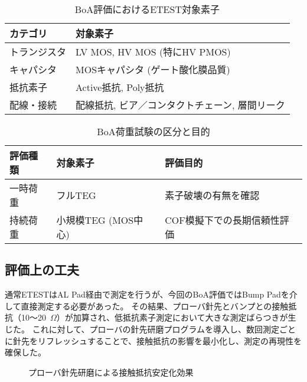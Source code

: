 \documentclass[conference]{IEEEtran}
\begin{document}
\begin{table}[htbp]
\centering
\caption{BoA評価におけるETEST対象素子}
\label{tab:etest_devices}
\begin{tabular}{|l|l|}
\hline
カテゴリ & 対象素子 \\
\hline
トランジスタ & LV MOS, HV MOS (特にHV PMOS) \\
キャパシタ   & MOSキャパシタ (ゲート酸化膜品質) \\
抵抗素子     & Active抵抗, Poly抵抗 \\
配線・接続   & 配線抵抗, ビア／コンタクトチェーン, 層間リーク \\
\hline
\end{tabular}
\end{table}

\begin{table}[htbp]
\centering
\caption{BoA荷重試験の区分と目的}
\label{tab:load_test}
\begin{tabular}{|l|l|l|}
\hline
評価種類 & 対象素子 & 評価目的 \\
\hline
一時荷重 & フルTEG & 素子破壊の有無を確認 \\
持続荷重 & 小規模TEG (MOS中心) & COF模擬下での長期信頼性評価 \\
\hline
\end{tabular}
\end{table}

\subsection{評価上の工夫}
通常ETESTはAL Pad経由で測定を行うが、今回のBoA評価ではBump Padを介して直接測定する必要があった。  
その結果、プローバ針先とバンプとの接触抵抗（10〜20~$\Omega$）が加算され、低抵抗素子測定において大きな測定ばらつきが生じた。  
これに対して、プローバの針先研磨プログラムを導入し、数回測定ごとに針先をリフレッシュすることで、接触抵抗の影響を最小化し、測定の再現性を確保した。

\begin{figure}[t]
  \centering
  \caption{プローバ針先研磨による接触抵抗安定化効果}
\end{figure}
\end{document}
